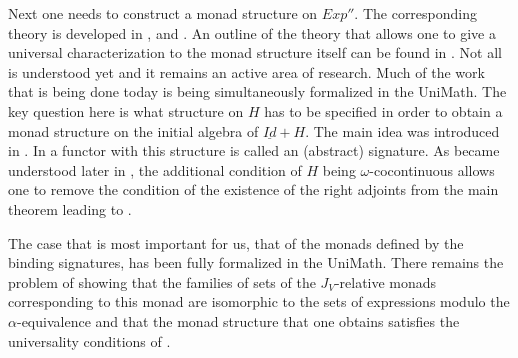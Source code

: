 \documentclass[12pt]{amsart}
\renewcommand{\comment}[1]{}
\newcommand{\uu}{\underline}
\begin{document}
Next one needs to construct a monad structure on $Exp''$. The corresponding theory is developed in \cite{MatthesUustalu}, \cite{AM2016} and \cite{AMM2016}. An outline of the theory that allows one to give a universal characterization to the monad structure itself can be found in \cite{HM2012}. Not all is understood yet and it remains an active area of research. Much of the work that is being done today is being simultaneously formalized in the UniMath. The key question here is what structure on $H$ has to be specified in order to obtain a monad structure on the initial algebra of $\uu{Id}+H$. The main idea was introduced in \cite{MatthesUustalu}. In \cite{AM2016} a functor with this structure is called an (abstract) signature. As became understood later in  \cite{AMM2016}, the additional condition of $H$ being $\omega$-cocontinuous allows one to remove the condition of the existence of the right adjoints from the main theorem \cite[Th. 15, p.170]{MatthesUustalu} leading to \cite[Th. 48]{AMM2016}.

The case that is most important for us, that of the monads defined by the binding signatures, has been fully formalized in the UniMath. There remains the problem of showing that the families of sets of the $J_V$-relative monads corresponding to this  monad are isomorphic to the sets of expressions modulo the $\alpha$-equivalence and that the monad structure that one obtains satisfies the universality conditions of \cite{HM2012}.   

\comment{As was envisioned in \cite{FPT}, the isomorphisms, for $X\subset V$, between the sets $Exp''(X)$ and the corresponding sets of expressions modulo the $\alpha$-equivalence depend on the choice of the binary coproduct structure on $Sets(U)$. Choosing the usual inclusions of $X$ and $Y$ into $X\coprod Y$ as the structural ones leads to one set of isomorphisms while choosing the inclusions composed with the permutation of $X$ and $Y$ as the structural ones to another. The first set, for $X=stn(n)$,  corresponds to the description of the $\alpha$-equivalence classes using De Bruijn {\em levels} (numbered from $0$) while the second one corresponds to the description using De Bruijn {\em indices} (also numbered from $0$). For the details see \cite{FPT} and \cite{deBruijn72}. It is quite beautiful how two approaches to choosing canonical representatives in the $\alpha$-equivalence classes, which have long been known and used in the practice of programming, correspond to two different choices of the binary coproduct structure on the category of sets!
}
\end{document}
